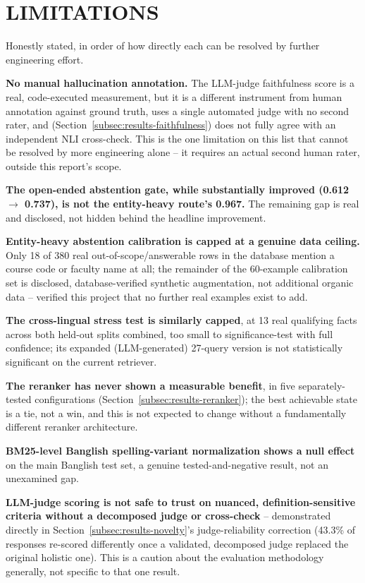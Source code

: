 \documentclass[a4paper,twoside]{article}
\begin{document}
\section{\uppercase{Limitations}}
\label{sec:limitations}

Honestly stated, in order of how directly each can be resolved by further engineering effort.

\textbf{No manual hallucination annotation.} The LLM-judge faithfulness score is a real, code-executed measurement, but it is a different instrument from human annotation against ground truth, uses a single automated judge with no second rater, and (Section~\ref{subsec:results-faithfulness}) does not fully agree with an independent NLI cross-check. This is the one limitation on this list that cannot be resolved by more engineering alone -- it requires an actual second human rater, outside this report's scope.

\textbf{The open-ended abstention gate, while substantially improved (0.612 $\to$ 0.737), is not the entity-heavy route's 0.967.} The remaining gap is real and disclosed, not hidden behind the headline improvement.

\textbf{Entity-heavy abstention calibration is capped at a genuine data ceiling.} Only 18 of 380 real out-of-scope/answerable rows in the database mention a course code or faculty name at all; the remainder of the 60-example calibration set is disclosed, database-verified synthetic augmentation, not additional organic data -- verified this project that no further real examples exist to add.

\textbf{The cross-lingual stress test is similarly capped}, at 13 real qualifying facts across both held-out splits combined, too small to significance-test with full confidence; its expanded (LLM-generated) 27-query version is not statistically significant on the current retriever.

\textbf{The reranker has never shown a measurable benefit}, in five separately-tested configurations (Section~\ref{subsec:results-reranker}); the best achievable state is a tie, not a win, and this is not expected to change without a fundamentally different reranker architecture.

\textbf{BM25-level Banglish spelling-variant normalization shows a null effect} on the main Banglish test set, a genuine tested-and-negative result, not an unexamined gap.

\textbf{LLM-judge scoring is not safe to trust on nuanced, definition-sensitive criteria without a decomposed judge or cross-check} -- demonstrated directly in Section~\ref{subsec:results-novelty}'s judge-reliability correction (43.3\% of responses re-scored differently once a validated, decomposed judge replaced the original holistic one). This is a caution about the evaluation methodology generally, not specific to that one result.
\end{document}
